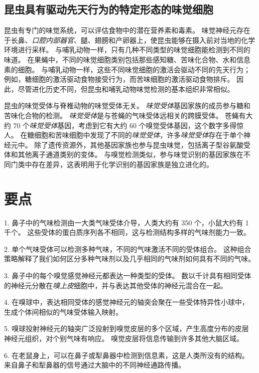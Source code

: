 \subsection{昆虫具有驱动先天行为的特定形态的味觉细胞}

昆虫有专门的味觉系统，可以评估食物中的潜在营养素和毒素。
味觉神经元存在于长鼻、\textit{口腔内部器官}、腿、翅膀和产卵器上，使昆虫能够在摄入前对当地的化学环境进行采样。
与哺乳动物一样，只有几种不同类型的味觉细胞能检测到不同的味道。
在果蝇中，不同的味觉细胞类别包括那些感知糖、苦味化合物、水和信息素的细胞。
与哺乳动物一样，这些不同味觉细胞的激活会驱动不同的先天行为；
例如，糖细胞的激活驱动食物接受行为，而苦味细胞的激活驱动食物排斥。
因此，尽管进化历史不同，但昆虫和哺乳动物味觉检测的基本组织非常相似。


昆虫的味觉受体与脊椎动物的味觉受体无关。
\textit{味觉受体}基因家族的成员参与糖和苦味化合物的检测。
\textit{味觉受体}是与苍蝇的气味受体远相关的跨膜受体。
苍蝇有大约 70 个\textit{味觉受体}基因，考虑到它有大约 60 个嗅觉受体基因，这个数字多得惊人。
在糖细胞和苦味细胞中发现了不同的\textit{味觉受体}，许多\textit{味觉受体}存在于单个神经元中。
除了遗传资源外，其他基因家族也参与昆虫味觉，包括离子型谷氨酸受体和其他离子通道类别的变体。
与嗅觉检测类似，参与味觉识别的基因家族在不同门类中存在差异，这表明用于化学识别的基因家族是独立进化的。



\section{要点}

1. 鼻子中的气味检测由一大类气味受体介导，人类大约有 350 个，小鼠大约有 1 千个。
这些受体的蛋白质序列各不相同，这与检测结构多样的气味剂能力一致。


2. 单个气味受体可以检测多种气味，不同的气味激活不同的受体组合。
这种组合策略解释了我们如何区分多种气味剂以及几乎相同的气味剂如何具有不同的气味。


3. 鼻子中的每个嗅觉感觉神经元都表达一种类型的受体。
数以千计具有相同受体的神经元分散在\textit{嗅上皮}细胞中，并与表达其他受体的神经元混合在一起。


4. 在嗅球中，表达相同受体的感觉神经元的轴突会聚在一些受体特异性小球中，生成个体间相似的气味受体输入映射。


5. 嗅球投射神经元的轴突广泛投射到嗅觉皮层的多个区域，产生高度分布的皮层神经元组织，对个别气味有响应。
嗅觉皮层将信息传输到许多其他大脑区域。


6. 在老鼠身上，可以在鼻子或犁鼻器中检测到信息素，这是人类所没有的结构。
来自鼻子和犁鼻器的信号通过大脑中的不同神经通路传播。


